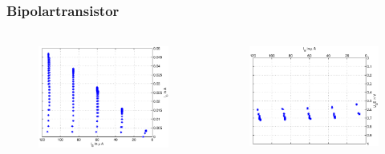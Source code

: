 \begin{frame}
    \frametitle{Bipolartransistor}
    \framesubtitle{}
    \begin{columns}[c]
         \begin{figure}[H]
         \begin{center}
                 \includegraphics[scale=0.3]{./img/bode/Aufgabe_1_doublestair_IC_IB.eps}
         \end{center}
         \end{figure}
         \begin{figure}[H]
         \begin{center}
                 \includegraphics[scale=0.3]{./img/bode/Aufgabe_1_doublestair_UB_IB.eps}

\end{center}
\end{figure}
\end{columns}
\end{frame}
